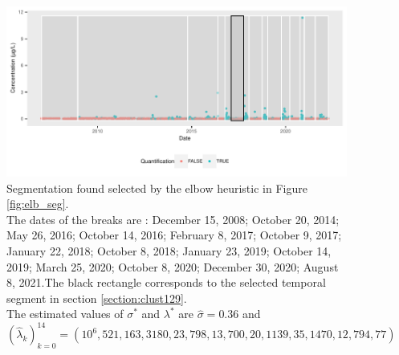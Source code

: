 \begin{figure}[htbp]
  \centering
  \includegraphics[]{figs/Chap5/Seg_opt-1.pdf}
  \caption{Segmentation found selected by the elbow heuristic in Figure \ref{fig:elb_seg}. \\
  The dates of the breaks are : December 15, 2008; October 20, 2014; May 26, 2016; October 14, 2016; February 8, 2017; October 9, 2017; January 22, 2018; October 8, 2018; January 23, 2019; October 14, 2019; March 25, 2020; October 8, 2020; December 30, 2020; August 8, 2021.The black rectangle corresponds to the selected temporal segment in section \ref{section:clust129}. \\
The estimated values of $\sigma^*$ and $\lambda^*$ are $\widehat{\sigma} = 0.36$ and\\ 
$(\widehat{\lambda}_k)_{k=0}^{14} =(10^6,521,163,3180,23,798,13,700,20,1139,35,1470,12,794,77)$}\label{fig:seg}
\end{figure}






